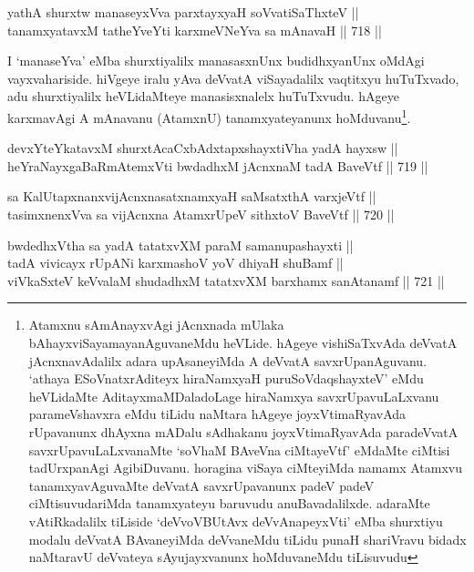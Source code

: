\begin{shl}
yathA shurxtw manaseyxVva parxtayxyaH soV\s vatiSaThxteV ||  \\
tanamxyatavxM tatheYveYti karxmeVNeYva sa mAnavaH \hfill || 718 ||  
\end{shl}

\begin{artha} 
I `manaseYva' eMba shurxtiyalilx manasasxnUnx budidhxyanUnx oMdAgi vayxvahariside. hiVgeye iralu yAva deVvatA viSayadalilx vaqtitxyu huTuTxvado, adu shurxtiyalilx heVLidaMteye manasisxnalelx huTuTxvudu. hAgeye karxmavAgi A mAnavanu (AtamxnU) tanamxyateyanunx hoMduvanu\footnote{Atamxnu sAmAnayxvAgi jAcnxnada mUlaka bAhayxviSayamayanAguvaneMdu heVLide. hAgeye vishiSaTxvAda deVvatA jAcnxnavAdalilx adara upAsaneyiMda A deVvatA savxrUpanAguvanu. `athaya ESoV\s natxrAditeyx hiraNamxyaH puruSoVdaqshayxteV' eMdu heVLidaMte AditayxmaMDaladoLage hiraNamxya savxrUpavuLaLxvanu parameVshavxra eMdu tiLidu naMtara hAgeye joyxVtimaRyavAda rUpavanunx dhAyxna mADalu sAdhakanu joyxVtimaRyavAda paradeVvatA savxrUpavuLaLxvanaMte `soVhaM BAveVna ciMtayeVtf' eMdaMte ciMtisi tadUrxpanAgi AgibiDuvanu. horagina viSaya ciMteyiMda namamx Atamxvu tanamxyavAguvaMte deVvatA savxrUpavanunx padeV padeV ciMtisuvudariMda tanamxyateyu baruvudu anuBavadalilxde. adaraMte vAtiRkadalilx tiLiside \ndash  `deVvoVBUtAvx deVvAnapeyxVti' eMba shurxtiyu modalu deVvatA BAvaneyiMda deVvaneMdu tiLidu punaH shariVravu bidadx naMtaravU deVvateya sAyujayxvanunx hoMduvaneMdu tiLisuvudu}.
\end{artha}


\begin{shl}
devxYteYkatavxM shurxtAcaCxbAdxtapxshayxtiVha yadA hayxsw || \\
heYraNayxgaBaRmAtemxVti bwdadhxM jAcnxnaM tadA BaveVtf \hfill || 719 ||  
\end{shl}
				
\begin{shl}
sa KalUtapxnanxvijAcnxnasatxnamxyaH saMsatxthA varxjeVtf || \\
tasimxnenxVva sa vijAcnxna AtamxrUpeV sithxtoV BaveVtf \hfill || 720 ||  
\end{shl}
				
\begin{shl}
bwdedhxV\s tha sa yadA tatatxvXM paraM samanupashayxti || \\
tadA vivicayx rUpANi karxmashoV yoV dhiyaH shuBamf || \\
viVkaSxteV keVvalaM shudadhxM tatatxvXM barxhamx sanAtanamf \hfill || 721 ||  
\end{shl}

